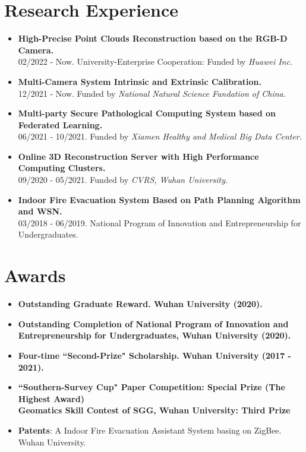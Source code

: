 \documentclass[a4paper]{article}
\begin{document}
\section{Research Experience}
\vspace{-0.5em}
\begin{itemize}
      \item \textbf{High-Precise Point Clouds Reconstruction based on the RGB-D Camera.}\\
            02/2022 - Now. University-Enterprise Cooperation: Funded by \textit{Huawei Inc.}\vspace{-0.5em}
      \item \textbf{Multi-Camera System Intrinsic and Extrinsic Calibration.}\\
            12/2021 - Now. Funded by \textit{National Natural Science Fundation of China.}\vspace{-0.5em}
      \item \textbf{Multi-party Secure Pathological Computing System based on Federated Learning.}\\
            06/2021 - 10/2021. Funded by \textit{Xiamen Healthy and Medical Big Data Center.}\vspace{-0.5em}
      \item \textbf{Online 3D Reconstruction Server with High Performance Computing Clusters.}\\
            09/2020 - 05/2021. Funded by \textit{CVRS, Wuhan University.}\vspace{-0.5em}
      \item \textbf{Indoor Fire Evacuation System Based on Path Planning Algorithm and WSN.}\\
            03/2018 - 06/2019. National Program of Innovation and Entrepreneurship for Undergraduates.
\end{itemize}


\section{Awards}
\vspace{-0.5em}
\begin{itemize}[itemsep = -0.5em,topsep = 0em]
      \item \textbf{Outstanding Graduate Reward. Wuhan University (2020).}
      \item \textbf{Outstanding Completion of National Program of Innovation and Entrepreneurship for Undergraduates, Wuhan University (2020).}
      \item \textbf{Four-time ``Second-Prize" Scholarship. Wuhan University (2017 - 2021).}
      \item \textbf{``Southern-Survey Cup" Paper Competition: Special Prize (The Highest Award)\\
                  Geomatics Skill Contest of SGG, Wuhan University: Third Prize}
      \item \textbf{Patents}: A Indoor Fire Evacuation Assistant System basing on ZigBee. Wuhan University.
\end{itemize}
\end{document}
